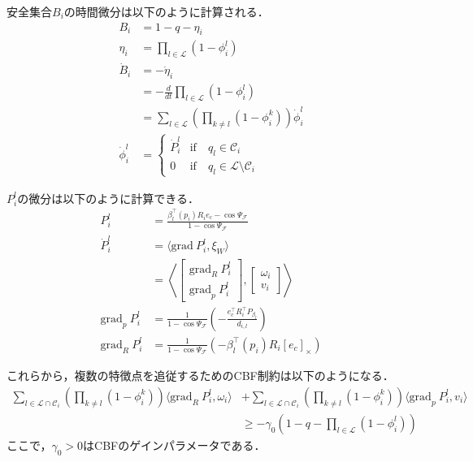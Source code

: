 安全集合$B_i$の時間微分は以下のように計算される．
\begin{equation}
\begin{aligned}
B_{i} &= 1-q-\eta_{i} \\
\eta_{i} &= \prod_{l\in\mathcal{L}}(1-\phi_{i}^l) \\
\dot{B}_{i} &= -\dot{\eta}_{i} \\
&= -\frac{d}{dt}\prod_{l\in\mathcal{L}}(1-\phi_{i}^l) \\
&= \sum_{l\in \mathcal{L}}(\prod_{k\neq l}(1-\phi_{i}^k))\dot{\phi}^l_{i} \\
\dot{\phi}^l_{i} &= \left\{ \begin{array}{ll}
\dot{P}_i^l & \mathrm{if} \quad q_l\in\mathcal{C}_i \\
0 & \mathrm{if} \quad q_l\in \mathcal{L}\setminus\mathcal{C}_i
\end{array} \right.
\label{eq:safe_set_derivative_multi}
\end{aligned}
\end{equation}

$P_i^l$の微分は以下のように計算できる．
\begin{equation}
\begin{aligned}
P_i^l &= \frac{\beta_l^\top(p_i) R_i e_c -\cos\Psi_\mathcal{F}}{1-\cos\Psi_\mathcal{F}} \\
\dot{P}_i^l &= \langle \mathrm{grad}\:P_i^l, \xi_W\rangle \\
&= \left\langle 
\begin{bmatrix}\mathrm{grad}_R\:P_i^l\\\mathrm{grad}_p\:P_i^l
\end{bmatrix},
\begin{bmatrix}\omega_i\\v_i
\end{bmatrix}
\right\rangle \\
\mathrm{grad}_p\:P_i^l &= \frac{1}{1-\cos \Psi_\mathcal{F}}\left(-\frac{e_c^\top R_i^\top P_{\beta_l}}{d_{i,l}}\right) \\
\mathrm{grad}_R\:P_i^l &= \frac{1}{1-\cos \Psi_\mathcal{F}}(-\beta_l^\top(p_i) R_i [e_c]_\times)
\label{eq:probability_derivative}
\end{aligned}
\end{equation}

これらから，複数の特徴点を追従するためのCBF制約は以下のようになる．
\begin{equation}
\begin{aligned}
\sum_{l\in \mathcal{L}\cap\mathcal{C}_i}(\prod_{k\neq l}(1-\phi_{i}^k)) \langle \mathrm{grad}_R\:P_i^l,\omega_i\rangle &+ \sum_{l\in \mathcal{L}\cap\mathcal{C}_i}(\prod_{k\neq l}(1-\phi_{i}^k)) \langle \mathrm{grad}_p\:P_i^l,v_i\rangle \\
&\geq -\gamma_0 (1-q-\prod_{l\in\mathcal{L}}(1-\phi_{i}^l))
\label{eq:cbf_constraint_multi}
\end{aligned}
\end{equation}
ここで，$\gamma_0 > 0$はCBFのゲインパラメータである．


